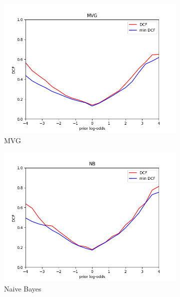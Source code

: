 \begin{figure}[h!]
    \centering
    \begin{subfigure}[b]{0.3\linewidth}
        \includegraphics[width=\linewidth]{Lab/07. Lab 07/Images/01. MVG}
        \caption{MVG}
        \label{fig:dcfMVG}
    \end{subfigure}
    \begin{subfigure}[b]{0.3\linewidth}
        \includegraphics[width=\linewidth]{Lab/07. Lab 07/Images/02. Naive Bayes}
        \caption{Naive Bayes}
        \label{fig:dcfNB}
    \end{subfigure}
    \begin{subfigure}[b]{0.3\linewidth}

\end{subfigure}
\end{figure}
